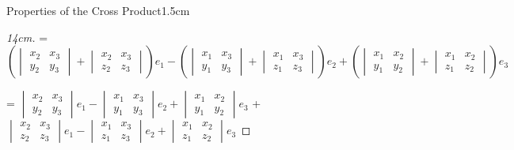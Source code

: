 \begin{ltheorem}{Properties of the Cross Product}{1.5cm}
\begin{proof}[14cm]
                \hspace{0.1cm}
                = $(\begin{vmatrix}
                    x_2 & x_3 \\
                    y_2 & y_3 
                \end{vmatrix} +
                \begin{vmatrix}
                    x_2 & x_3 \\
                    z_2 & z_3 
                \end{vmatrix})e_1
                - (\begin{vmatrix}
                    x_1 & x_3 \\
                    y_1 & y_3 
                \end{vmatrix} +
                \begin{vmatrix}
                    x_1 & x_3 \\
                    z_1 & z_3 
                \end{vmatrix})e_2
                + (\begin{vmatrix}
                    x_1 & x_2 \\
                    y_1 & y_2 
                \end{vmatrix} +
                \begin{vmatrix}
                    x_1 & x_2 \\
                    z_1 & z_2 
                \end{vmatrix})e_3$

                \hspace{0.1cm}
                = $\begin{vmatrix}
                    x_2 & x_3 \\
                    y_2 & y_3 
                \end{vmatrix}e_1
                - \begin{vmatrix}
                    x_1 & x_3 \\
                    y_1 & y_3 
                \end{vmatrix}e_2
                + \begin{vmatrix}
                    x_1 & x_2 \\
                    y_1 & y_2 
                \end{vmatrix}e_3$
                + $\begin{vmatrix}
                    x_2 & x_3 \\
                    z_2 & z_3 
                \end{vmatrix}e_1
                - \begin{vmatrix}
                    x_1 & x_3 \\
                    z_1 & z_3 
                \end{vmatrix}e_2
                + \begin{vmatrix}
                    x_1 & x_2 \\
                    z_1 & z_2 
                \end{vmatrix}e_3$


\end{proof}
\end{ltheorem}
